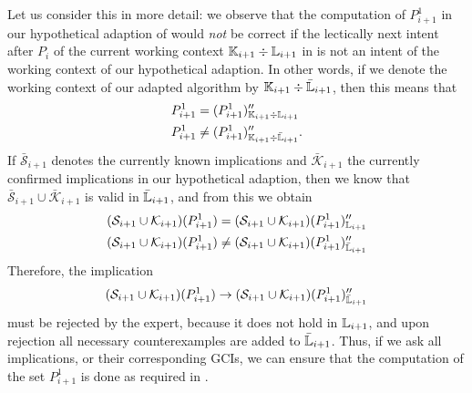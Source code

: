 Let us consider this in more detail: we observe that the computation of $P_{i+1}^{1}$ in
our hypothetical adaption of  would
\emph{not} be correct if the lectically next intent after $P_{i}$ of the current working
context ${\mathbb{K}}_{i+1} \div {\ensuremath{\mathbb{L}}}_{i+1}$ in 
is not an intent of the working context of our hypothetical adaption.  In other words, if
we denote the working context of our adapted algorithm by ${\mathbb{K}}_{i+1} \div \bar{{\mathbb{L}}}_{i+1}$, then this means that
\begin{align*}
  P_{i+1}^{1} &= (P_{i+1}^{1})_{{\mathbb{K}}_{i+1} \div {\ensuremath{\mathbb{L}}}_{i+1}}''\\
  P_{i+1}^{1} &\neq (P_{i+1}^{1})_{{\mathbb{K}}_{i+1} \div \bar{{\mathbb{L}}}_{i+1}}''.
\end{align*}
If $\bar{\mathcal{S}}_{i+1}$ denotes the currently known implications and
$\bar{\mathcal{K}}_{i+1}$ the currently confirmed implications in our hypothetical
adaption, then we know that $\bar{\mathcal{S}}_{i+1} \cup \bar{\mathcal{K}}_{i+1}$ is
valid in $\bar{{\mathbb{L}}}_{i+1}$, and from this we obtain
\begin{align*}
  (\mathcal{S}_{i+1} \cup \mathcal{K}_{i+1})(P_{i+1}^{1})
  &= (\mathcal{S}_{i+1} \cup \mathcal{K}_{i+1})(P_{i+1}^{1})_{{\mathbb{L}}_{i+1}}''\\
  (\mathcal{S}_{i+1} \cup \mathcal{K}_{i+1})(P_{i+1}^{1})
  &\neq (\mathcal{S}_{i+1} \cup \mathcal{K}_{i+1})(P_{i+1}^{1})_{\bar{{\mathbb{L}}}_{i+1}}''
\end{align*}
Therefore, the implication
\begin{equation*}
  (\mathcal{S}_{i+1} \cup \mathcal{K}_{i+1})(P_{i+1}^{1}) \to
  (\mathcal{S}_{i+1} \cup \mathcal{K}_{i+1})(P_{i+1}^{1})_{\bar{{\mathbb{L}}}_{i+1}}''
\end{equation*}
must be rejected by the expert, because it does not hold in ${\mathbb{L}}_{i+1}$, and upon
rejection all necessary counterexamples are added to $\bar{{\mathbb{L}}}_{i+1}$.  Thus, if we
ask all implications, or their corresponding GCIs, we can ensure that the computation of
the set $P_{i+1}^{1}$ is done as required in
.


